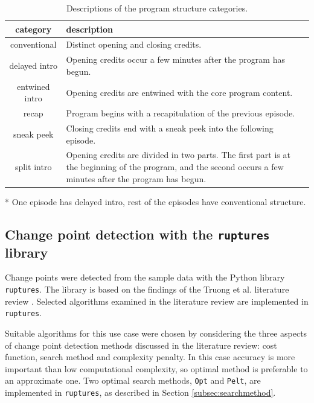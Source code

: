 \begin{table}[H]
  \begin{center}
    \begin{tabular}{|c|p{12.3cm}|}
      \hline
      \textbf{category} &  \hspace{0.5cm} \textbf{description}
      \\ \hline
      conventional & Distinct opening and closing credits.
      \\ \hline
      delayed intro & Opening credits occur a few minutes after the program has begun. 
      \\ \hline
      entwined intro & Opening credits are entwined with the core program content.
      \\ \hline
      recap & Program begins with a recapitulation of the previous episode.
      \\ \hline
      sneak peek & Closing credits end with a sneak peek into the following episode.
      \\ \hline
      split intro & Opening credits are divided in two parts. The first part is at the beginning of the program, and the second occurs a few minutes after the program has begun.
      \\ \hline
    \end{tabular}
  \end{center}
  \caption{Descriptions of the program structure categories.}
  \label{tab:structure}
\end{table}

\begin{center}
* One episode has delayed intro, rest of the episodes have conventional structure.
\end{center}

\subsection{Change point detection with the \texttt{ruptures} library} \label{subsec:solution}

Change points were detected from the sample data with the Python library \texttt{ruptures}. The library is based on the findings of the Truong et al. literature review \cite{truongSelectiveReviewOffline2020}. Selected algorithms examined in the literature review are implemented in \texttt{ruptures}.

Suitable algorithms for this use case were chosen by considering the three aspects of change point detection methods discussed in the literature review: cost function, search method and complexity penalty. In this case accuracy is more important than low computational complexity, so optimal method is preferable to an approximate one. Two optimal search methods, \texttt{Opt} and \texttt{Pelt}, are implemented in \texttt{ruptures}, as described in Section \ref{subsec:searchmethod}.

